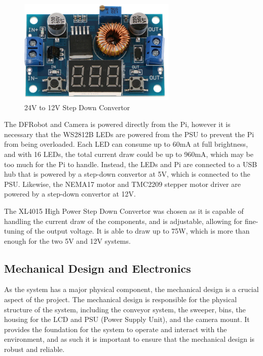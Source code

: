 \begin{figure}[H]
    \begin{minipage}[h]{\textwidth}
        \centering
        \includegraphics[height=5cm]{imgs/parts/stepdownconverter.jpg}
        \caption{24V to 12V Step Down Convertor \cite{stepdownconverter}}
    \end{minipage}
\end{figure}

The DFRobot and Camera is powered directly from the Pi, however it is necessary that the WS2812B LEDs are powered from the PSU to prevent the Pi from being overloaded. Each LED can consume up to 60mA at full brightness, and with 16 LEDs, the total current draw could be up to 960mA, which may be too much for the Pi to handle. Instead, the LEDs and Pi are connected to a USB hub that is powered by a step-down convertor at 5V, which is connected to the PSU. Likewise, the NEMA17 motor and TMC2209 stepper motor driver are powered by a step-down convertor at 12V.

The XL4015 High Power Step Down Convertor was chosen as it is capable of handling the current draw of the components, and is adjustable, allowing for fine-tuning of the output voltage. It is able to draw up to 75W, which is more than enough for the two 5V and 12V systems.

\subsection{Mechanical Design and Electronics}
\label{sec:mechanical-design}
As the system has a major physical component, the mechanical design is a crucial aspect of the project. The mechanical design is responsible for the physical structure of the system, including the conveyor system, the sweeper, bins, the housing for the LCD and PSU (Power Supply Unit), and the camera mount. It provides the foundation for the system to operate and interact with the environment, and as such it is important to ensure that the mechanical design is robust and reliable.

